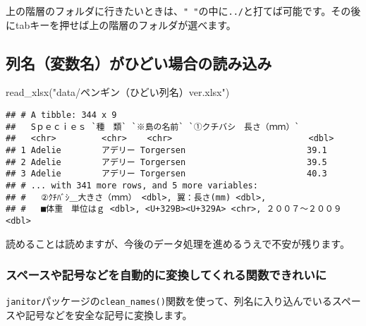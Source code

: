 \documentclass[
  xelatex,ja=standard, b5paper]{bxjsbook}
\newenvironment{Shaded}{\begin{snugshade}}{\end{snugshade}}
\newcommand{\FunctionTok}[1]{\textcolor[rgb]{0.00,0.00,0.00}{#1}}
\newcommand{\NormalTok}[1]{#1}
\newcommand{\StringTok}[1]{\textcolor[rgb]{0.31,0.60,0.02}{#1}}
\begin{document}
上の階層のフォルダに行きたいときは、\texttt{"\ "}の中に\texttt{../}と打てば可能です。その後にtabキーを押せば上の階層のフォルダが選べます。

\hypertarget{ux5217ux540dux5909ux6570ux540dux304cux3072ux3069ux3044ux5834ux5408ux306eux8aadux307fux8fbcux307f}{%
\subsection{列名（変数名）がひどい場合の読み込み}\label{ux5217ux540dux5909ux6570ux540dux304cux3072ux3069ux3044ux5834ux5408ux306eux8aadux307fux8fbcux307f}}

\begin{Shaded}
\begin{Highlighting}[]
\FunctionTok{read\_xlsx}\NormalTok{(}\StringTok{"data/ペンギン（ひどい列名）ver.xlsx"}\NormalTok{)}
\end{Highlighting}
\end{Shaded}

\begin{verbatim}
## # A tibble: 344 x 9
##   Sｐｅｃｉｅｓ `種　類` `※島の名前` `①クチバシ　長さ（ｍｍ）`
##   <chr>         <chr>    <chr>                           <dbl>
## 1 Adelie        アデリー Torgersen                        39.1
## 2 Adelie        アデリー Torgersen                        39.5
## 3 Adelie        アデリー Torgersen                        40.3
## # ... with 341 more rows, and 5 more variables:
## #   ②ｸﾁﾊﾞｼ＿大きさ（ｍｍ） <dbl>, 翼：長さ(mm) <dbl>,
## #   ■体重　単位はｇ <dbl>, <U+329B><U+329A> <chr>, ２００７～２００９ <dbl>
\end{verbatim}

読めることは読めますが、今後のデータ処理を進めるうえで不安が残ります。

\hypertarget{ux30b9ux30daux30fcux30b9ux3084ux8a18ux53f7ux306aux3069ux3092ux81eaux52d5ux7684ux306bux5909ux63dbux3057ux3066ux304fux308cux308bux95a2ux6570ux3067ux304dux308cux3044ux306b}{%
\subsubsection{スペースや記号などを自動的に変換してくれる関数できれいに}\label{ux30b9ux30daux30fcux30b9ux3084ux8a18ux53f7ux306aux3069ux3092ux81eaux52d5ux7684ux306bux5909ux63dbux3057ux3066ux304fux308cux308bux95a2ux6570ux3067ux304dux308cux3044ux306b}}

\texttt{janitor}パッケージの\texttt{clean\_names()}関数を使って、列名に入り込んでいるスペースや記号などを安全な記号に変換します。
\end{document}
